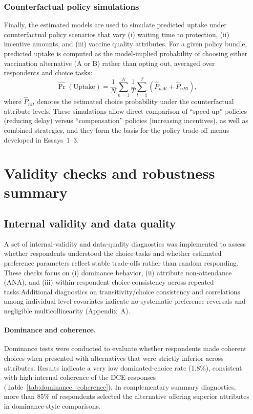 \documentclass[doublespacing]{utdthesis}
\begin{document}
\subsubsection{Counterfactual policy simulations}
Finally, the estimated models are used to simulate predicted uptake under counterfactual policy scenarios that vary (i) waiting time to protection, (ii) incentive amounts, and (iii) vaccine quality attributes. For a given policy bundle, predicted uptake is computed as the model-implied probability of choosing either vaccination alternative (A or B) rather than opting out, averaged over respondents and choice tasks:
\begin{equation}
\widehat{\Pr}(\text{Uptake}) = \frac{1}{N}\sum_{n=1}^{N}\frac{1}{T}\sum_{t=1}^{T} \left( \hat{P}_{nAt} + \hat{P}_{nBt} \right),
\label{eq:uptake}
\end{equation}
where $\hat{P}_{nit}$ denotes the estimated choice probability under the counterfactual attribute levels. These simulations allow direct comparison of ``speed-up'' policies (reducing delay) versus ``compensation'' policies (increasing incentives), as well as combined strategies, and they form the basis for the policy trade-off menus developed in Essays~1--3.


\section{Validity checks and robustness summary}
\label{sec:validity_robustness}

\subsection{Internal validity and data quality}
\label{subsec:internal_validity}

A set of internal-validity and data-quality diagnostics was implemented to assess whether respondents understood the choice tasks and whether estimated preference parameters reflect stable trade-offs rather than random responding. These checks focus on (i) dominance behavior, (ii) attribute non-attendance (ANA), and (iii) within-respondent choice consistency across repeated tasks.Additional diagnostics on transitivity/choice consistency and correlations among individual-level covariates indicate no systematic preference reversals and negligible multicollinearity (Appendix~A).


\paragraph{Dominance and coherence.}
Dominance tests were conducted to evaluate whether respondents made coherent choices when presented with alternatives that were strictly inferior across attributes. Results indicate a very low dominated-choice rate (1.8\%), consistent with high internal coherence of the DCE responses (Table~\ref{tab:dominance_coherence}). In complementary summary diagnostics, more than 85\% of respondents selected the alternative offering superior attributes in dominance-style comparisons.
\end{document}
